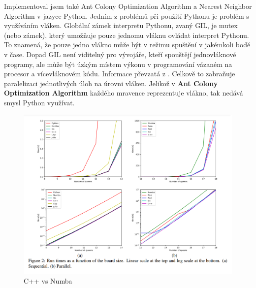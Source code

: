 Implementoval jsem také Ant Colony Optimization Algorithm a Nearest Neighbor Algorithm v jazyce Python. Jedním z problémů při použití Pythonu je problém s využíváním vláken. Globální zámek interpretu Pythonu, zvaný GIL, je mutex (nebo zámek), který umožňuje pouze jednomu vláknu ovládat interpret Pythonu. To znamená, že pouze jedno vlákno může být v režimu spuštění v jakémkoli bodě v čase. Dopad GIL není viditelný pro vývojáře, kteří spouštějí jednovláknové programy, ale může být úzkým místem výkonu v programování vázaném na procesor a vícevláknovém kódu. Informace převzatá z \cite{RealPythonGIL}.
Celkově to zabraňuje paralelizaci jednotlivých úloh na úrovni vláken. Jelikož v \textbf{Ant Colony Optimization Algorithm} každého mravence reprezentuje vlákno, tak nedává smysl Python využívat. 
\begin{figure}[H]
\includegraphics[width=15cm]{obrazky-figures/cpp_vs_numba.png}
\caption{C++ vs Numba}
\label{fig:Cpp vs Numba}
\end{figure}


